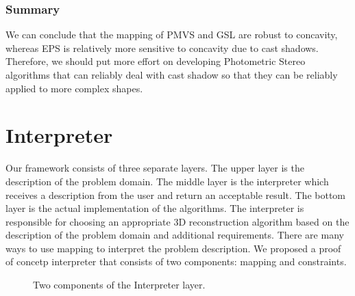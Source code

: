 \subsubsection{Summary}
We can conclude that the mapping of PMVS and GSL are robust to concavity, whereas EPS is relatively more sensitive to concavity due to cast shadows. Therefore, we should put more effort on developing Photometric Stereo algorithms that can reliably deal with cast shadow so that they can be reliably applied to more complex shapes.


\section{Interpreter}
Our framework consists of three separate layers. The upper layer is the description of the problem domain. The middle layer is the interpreter which receives a description from the user and return an acceptable result. The bottom layer is the actual implementation of the algorithms. The interpreter is responsible for choosing an appropriate 3D reconstruction algorithm based on the description of the problem domain and additional requirements. There are many ways to use mapping to interpret the problem description. We proposed a proof of concetp interpreter that consists of two components: mapping and constraints.
\begin{figure}[!htbp]
\centering
{}
\caption{Two components of the Interpreter layer.}
\label{fig:interpreter_layer}
\end{figure}

